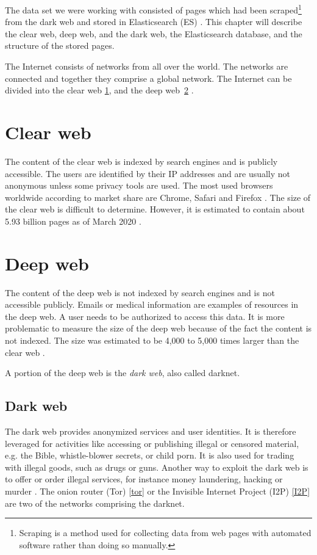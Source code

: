 \label{datasetAnalysis}
The data set we were working with consisted of pages which had been scraped\footnote{Scraping is a method used for collecting data from web pages with automated software rather than doing so manually.} from the dark web and stored in Elasticsearch (ES) \cite{elasticSearch}. This chapter will describe the clear web, deep web, and the dark web, the Elasticsearch database, and the structure of the stored pages.

The Internet consists of networks from all over the world. The networks are connected and together they comprise a global network. The Internet can be divided into the clear web \ref{clearWeb}, and the deep web~\ref{deepWeb} \cite{internetStructure}.

\section{Clear web} \label{clearWeb}
The content of the clear web is indexed by search engines and is publicly accessible. The users are identified by their IP addresses and are usually not anonymous unless some privacy tools are used. The most used browsers worldwide according to market share are Chrome, Safari and Firefox \cite{browserMarketShare}. The size of the clear web is difficult to determine. However, it is estimated to contain about 5.93 billion pages as of March 2020 \cite{clearWebSize}.

\section{Deep web} \label{deepWeb}
The content of the deep web is not indexed by search engines and is not accessible publicly. Emails or medical information are examples of resources in the deep web. A user needs to be authorized to access this data. It is more problematic to measure the size of the deep web because of the fact the content is not indexed. The size was estimated to be 4,000 to 5,000 times larger than the clear web \cite{deepWebSize}. 

A portion of the deep web is the \textit{dark web}, also called darknet. 

\subsection{Dark web} \label{darkWeb}
The dark web provides anonymized services and user identities. It is therefore leveraged for activities like accessing or publishing illegal or censored material, e.g. the Bible, whistle-blower secrets, or child porn. It is also used for trading with illegal goods, such as drugs or guns. Another way to exploit the dark web is to offer or order illegal services, for instance money laundering, hacking or murder \cite{theDarkNet}. The onion router (Tor) \ref{tor} or the Invisible Internet Project (I2P) \ref{I2P} are two of the networks comprising the darknet. 

